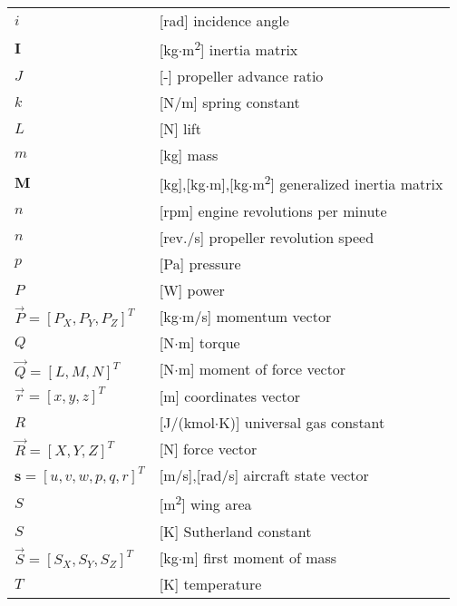 \begin{longtable}[l]{ l p{} }
  $i$                                          & [rad] incidence angle \\
  $\boldsymbol I$                              & [kg$\cdot$m\textsuperscript{2}] inertia matrix \\
  $J$                                          & [-] propeller advance ratio \\
  $k$                                          & [N/m] spring constant \\
  $L$                                          & [N] lift \\
  $m$                                          & [kg] mass \\
  $\boldsymbol M$                              & [kg],[kg$\cdot$m],[kg$\cdot$m\textsuperscript{2}] generalized inertia matrix \\
  $n$                                          & [rpm] engine revolutions per minute \\
  $n$                                          & [rev./s] propeller revolution speed \\
  $p$                                          & [Pa] pressure \\
  $P$                                          & [W] power \\
  $\vec P=\left[ P_X, P_Y, P_Z \right]^T$      & [kg$\cdot$m/s] momentum vector \\
  $Q$                                          & [N$\cdot$m] torque \\
  $\vec Q=\left[ L, M, N \right]^T$            & [N$\cdot$m] moment of force vector \\
  $\vec r=\left[ x, y, z \right]^T$            & [m] coordinates vector \\
  $R$                                          & [J/(kmol$\cdot$K)] universal gas constant \\
  $\vec R=\left[ X, Y, Z \right]^T$            & [N] force vector \\
  $\boldsymbol s=\left[ u,v,w,p,q,r \right]^T$ & [m/s],[rad/s] aircraft state vector \\
  $S$                                          & [m\textsuperscript{2}] wing area \\
  $S$                                          & [K] Sutherland constant \\
  $\vec S=\left[ S_X, S_Y, S_Z \right]^T$      & [kg$\cdot$m] first moment of mass \\
  $T$                                          & [K] temperature \\

\end{longtable}
